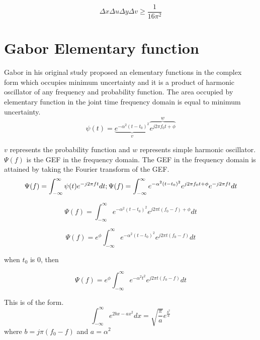 \documentclass[paper=a4, fontsize=11pt,twoside]{scrartcl}		%
\begin{document}
\begin{equation*}
\Delta x\Delta u  \Delta y\Delta v    \geq \frac{1}{16\pi^2}
\end{equation*}


\section{Gabor Elementary function}

Gabor in his original study proposed an elementary functions in the complex form which occupies minimum uncertainty and it is a product of harmonic oscillator of any frequency and probability function. The area occupied by elementary function in the joint time frequency domain is equal to minimum uncertainty.
\begin{equation}
\psi(t) = \underbrace{e^{-\alpha ^2(t-t_0)^2}}_v\overbrace{e^{j2\pi f_0 t+\phi}}^w
\end{equation}

$v$ represents the probability function and $w$ represents simple harmonic oscillator.
$\Psi(f)$ is the GEF in the frequency domain. The GEF in the frequency domain is attained by taking the Fourier transform of the GEF.
\begin{equation*}
\Psi(f) = {\int_{-\infty}^{\infty}{\psi(t) e^{-j2\pi ft}dt}};
\Psi(f) = {\int_{-\infty}^{\infty}{e^{-\alpha ^2(t-t_0)^2}e^{j2\pi f_0 t+\phi} e^{-j2\pi ft}dt}}\\
\end{equation*}

\begin{equation*}
\Psi(f) = {\int_{-\infty}^{\infty}{e^{-\alpha ^2(t-t_0)^2}e^{j2\pi t(f_0-f) +\phi}dt}}
\end{equation*}

\begin{equation*}
\Psi(f) = e^\phi{\int_{-\infty}^{\infty}{e^{-\alpha ^2(t-t_0)^2}e^{j2\pi t(f_0-f) }dt}}
\end{equation*}

when $t_0$ is 0, then

\begin{equation}
\Psi(f) = e^\phi{\int_{-\infty}^{\infty}{e^{-\alpha ^2 t^2}e^{j2\pi t(f_0-f) }dt}}
\end{equation}


This is of the form.
\begin{equation*}
\int_{-\infty}^{\infty}e^{2bx - ax^2 }dx = \sqrt{\frac{\pi}{a}} e^\frac{b^2}{a}
\end{equation*}
where $b = j \pi(f_0-f)$ and $a = \alpha ^ 2$
\end{document}
